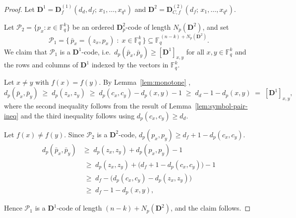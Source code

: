\documentclass[11pt,draftclsnofoot,journal,onecolumn]{IEEEtran}
\begin{document}
    \begin{proof}
    Let $\boldsymbol{D}^1=\boldsymbol{D}^{(1)}_{f}(d_d,d_f;\,x_1,\dots,x_{q^k})$ and $\boldsymbol{D}^2=\boldsymbol{D}^{(2)}_{C,f}(d_f;\,x_1,\dots,x_{q^k})$.
    
    Let $\mathcal{P}_2=\{p_x : x\in\mathbb{F}_q^{k}\}$ be an ordered $\boldsymbol{D}_p^2$-code of length $N_p(\boldsymbol{D}^2)$, and set
    \[
      \mathcal{P}_1=\bigl\{\,\bar p_x=(z_x,p_x)\;:\;x\in\mathbb{F}_q^{k}\,\bigr\} \subseteq\mathbb{F}_q^{\,(n-k)+N_p(\boldsymbol{D}^2)} .
    \]
    We claim that $\mathcal{P}_1$ is a $\boldsymbol{D}^1$-code, i.e.\  $d_p(\bar p_x,\bar p_y)\ge[\boldsymbol{D}^1]_{x,y}$ for all $x, y \in \mathbb{F}_q^k$ and the rows and columns of $\boldsymbol{D}^1$ indexed by the vectors in $\mathbb{F}_q^k$.


    Let $x\neq y$ with $f(x)=f(y)$. By Lemma~\ref{lem:monotone} ,
    \[
    d_p(\bar p_x,\bar p_y)\;\ge\;d_p(z_x,z_y) \;\ge\;d_p(c_x,c_y)-d_p(x,y)-1 \;\ge\;d_d-1-d_p(x,y)\;=\;[\boldsymbol{D}^1]_{x,y},
    \]
    where the second inequality follows from the result of Lemma~\ref{lem:symbol-pair-ineq} and the third inequality follows using $d_p(c_x,c_y)\ge d_d$.

    Let $f(x)\neq f(y)$. Since $\mathcal{P}_2$ is a $\boldsymbol{D}^2$-code, $d_p(p_x,p_y)\ge d_f+1-d_p(c_x,c_y)$.
    \begin{align*}
        d_p(\bar p_x,\bar p_y) & \ge\;d_p(z_x,z_y)+d_p(p_x,p_y)-1\\
        & \;\ge\;d_p(z_x,z_y)+\bigl(d_f+1-d_p(c_x,c_y)\bigr)-1\\
        &\;\ge\;d_f-\bigl(d_p(c_x,c_y)-d_p(z_x,z_y)\bigr)\\
        & \;\ge\;d_f-1-d_p(x,y),
    \end{align*}
  

    Hence $\mathcal{P}_1$ is a $\boldsymbol{D}^1$-code of length $(n-k)+N_p(\boldsymbol{D}^2)$, and the claim follows.
    \end{proof}
\end{document}
